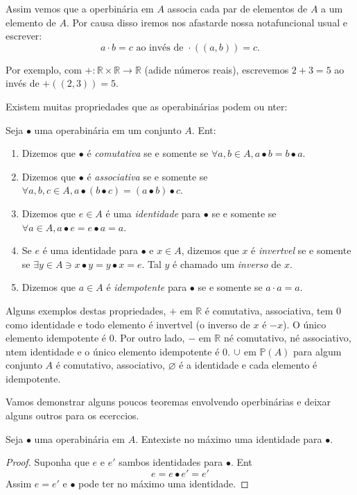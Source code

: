Assim vemos que a oper\cao bin\'aria em $A$ associa cada par de elementos de $A$ a um elemento de $A$. Por causa disso iremos nos afastarde nossa nota\cao funcional usual e escrever:
\[
a\cdot b=c \textrm{ ao inv\'es de } \cdot((a,b))=c.
\]

Por exemplo, com $+:\mathbb{R}\times\mathbb{R}\to\mathbb{R}$ (adi\cao de n\'umeros reais), escrevemos $2+3=5$ ao inv\'es de $+((2,3))=5$.

Existem muitas propriedades que as opera\coes bin\'arias podem ou n\ao ter:
\begin{definb}
Seja $\bullet$ uma opera\cao bin\'aria em um conjunto $A$. Ent\aoi:
\begin{enumerate}[{\bf a)}]
\item Dizemos que $\bullet$ \'e {\it comutativa} se e somente se $\forall a,b\in A, a\bullet b=b\bullet a$.
\item Dizemos que $\bullet$ \'e {\it associativa} se e somente se $\forall a,b,c\in A, a\bullet(b\bullet c)=(a\bullet b)\bullet c$.
\item Dizemos que $e\in A$ \'e uma {\it identidade} para $\bullet$ se e somente se $\forall a\in A, a\bullet e=e\bullet a=a$.
\item Se $e$ \'e uma identidade para $\bullet$ e $x\in A$, dizemos que $x$ \'e {\it invert\ih vel} se e somente se $\exists y\in A \ni x\bullet y=y\bullet x=e$. Tal $y$ \'e chamado um {\it inverso} de $x$.
\item Dizemos que $a\in A$ \'e {\it idempotente} para $\bullet$ se e somente se $a\cdot a=a$.
\end{enumerate}
\end{definb}

Alguns exemplos destas propriedades, $+$ em $\mathbb{R}$ \'e comutativa, associativa, tem $0$ como identidade e todo elemento \'e invert\ih vel (o inverso de $x$ \'e $-x$). O \'unico elemento idempotente \'e $0$. Por outro lado, $-$ em $\mathbb{R}$ n\ao \'e comutativo, n\ao \'e associativo, n\ao tem identidade e o \'unico elemento idempotente \'e $0$. $\cup$ em $\mathbb{P}(A)$ para algum conjunto $A$ \'e comutativo, associativo, $\varnothing$ \'e a identidade e cada elemento \'e idempotente.

Vamos demonstrar alguns poucos teoremas envolvendo oper\coes bin\'arias e deixar alguns outros para os ecerc\ih cios.
\begin{teob}
Seja $\bullet$ uma opera\cao bin\'aria em $A$. Ent\ao existe no m\'aximo uma identidade para $\bullet$.
\end{teob}
\begin{proof}
Suponha que $e$ e $e'$ s\ao ambos identidades para $\bullet$. Ent\ao
\[
e=e\bullet e'=e'
\]
Assim $e=e'$ e $\bullet$ pode ter no m\'aximo uma identidade.

\end{proof}
\\

